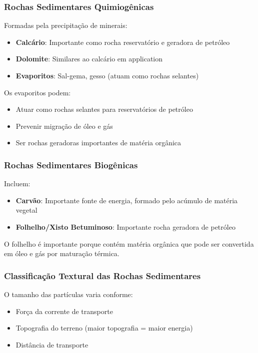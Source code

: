 \documentclass[12pt,a4paper,twoside]{book}
\begin{document}
\subsubsection{Rochas Sedimentares Quimiogênicas}

Formadas pela precipitação de minerais:
\begin{itemize}
    \item \textbf{Calcário}: Importante como rocha reservatório e geradora de petróleo
    \item \textbf{Dolomite}: Similares ao calcário em application
    \item \textbf{Evaporitos}: Sal-gema, gesso (atuam como rochas selantes)
\end{itemize}

Os evaporitos podem:
\begin{itemize}
    \item Atuar como rochas selantes para reservatórios de petróleo
    \item Prevenir migração de óleo e gás
    \item Ser rochas geradoras importantes de matéria orgânica
\end{itemize}

\subsubsection{Rochas Sedimentares Biogênicas}

Incluem:
\begin{itemize}
    \item \textbf{Carvão}: Importante fonte de energia, formado pelo acúmulo de matéria vegetal
    \item \textbf{Folhelho/Xisto Betuminoso}: Importante rocha geradora de petróleo
\end{itemize}

O folhelho é importante porque contém matéria orgânica que pode ser convertida em óleo e gás 
por maturação térmica.

\subsubsection{Classificação Textural das Rochas Sedimentares}

O tamanho das partículas varia conforme:
\begin{itemize}
    \item Força da corrente de transporte
    \item Topografia do terreno (maior topografia = maior energia)
    \item Distância de transporte
\end{itemize}
\end{document}
